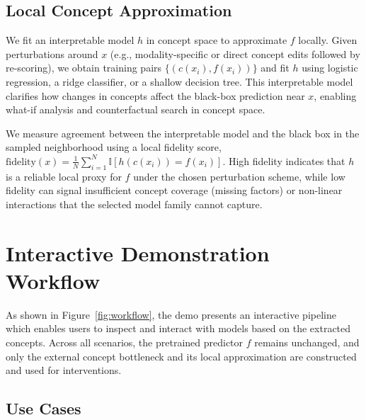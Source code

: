 \documentclass[sigconf,review,screen]{acmart}
\begin{document}
\subsection{Local Concept Approximation}
We fit an interpretable model $h$ in concept space to approximate $f$ locally. Given perturbations around $x$ (e.g., modality-specific or direct concept edits followed by re-scoring), we obtain training pairs $\{(c(x_i), f(x_i))\}$ and fit $h$ using logistic regression, a ridge classifier, or a shallow decision tree. This interpretable model clarifies how changes in concepts affect the black-box prediction near $x$, enabling what-if analysis and counterfactual search in concept space.

We measure agreement between the interpretable model and the black box in the sampled neighborhood using a local fidelity score, $\mathrm{fidelity}(x)=\frac{1}{N}\sum_{i=1}^{N}\mathbb{I}[h(c(x_i))=f(x_i)]$. High fidelity indicates that $h$ is a reliable local proxy for $f$ under the chosen perturbation scheme, while low fidelity can signal insufficient concept coverage (missing factors) or non-linear interactions that the selected model family cannot capture.

\section{Interactive Demonstration Workflow}
As shown in Figure~\ref{fig:workflow}, the demo presents an interactive pipeline which enables users to inspect and interact with models based on the extracted concepts. Across all scenarios, the pretrained predictor $f$ remains unchanged, and only the external concept bottleneck and its local approximation are constructed and used for interventions.


\subsection{Use Cases}
\end{document}
